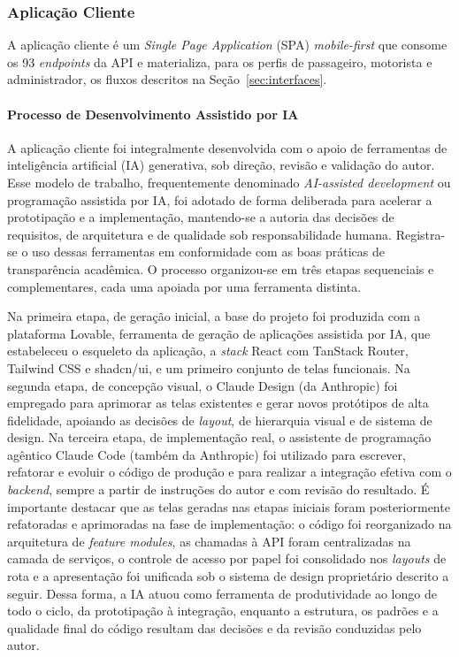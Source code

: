 \subsubsection{Aplicação Cliente}
\label{sec:cliente}

A aplicação cliente é um \textit{Single Page Application} (SPA) \textit{mobile-first} que consome os 93 \textit{endpoints} da API e materializa, para os perfis de passageiro, motorista e administrador, os fluxos descritos na Seção~\ref{sec:interfaces}.

\paragraph{Processo de Desenvolvimento Assistido por IA}

A aplicação cliente foi integralmente desenvolvida com o apoio de ferramentas de inteligência artificial (IA) generativa, sob direção, revisão e validação do autor. Esse modelo de trabalho, frequentemente denominado \textit{AI-assisted development} ou programação assistida por IA, foi adotado de forma deliberada para acelerar a prototipação e a implementação, mantendo-se a autoria das decisões de requisitos, de arquitetura e de qualidade sob responsabilidade humana. Registra-se o uso dessas ferramentas em conformidade com as boas práticas de transparência acadêmica. O processo organizou-se em três etapas sequenciais e complementares, cada uma apoiada por uma ferramenta distinta.

Na primeira etapa, de geração inicial, a base do projeto foi produzida com a plataforma Lovable, ferramenta de geração de aplicações assistida por IA, que estabeleceu o esqueleto da aplicação, a \textit{stack} React com TanStack Router, Tailwind CSS e shadcn/ui, e um primeiro conjunto de telas funcionais. Na segunda etapa, de concepção visual, o Claude Design (da Anthropic) foi empregado para aprimorar as telas existentes e gerar novos protótipos de alta fidelidade, apoiando as decisões de \textit{layout}, de hierarquia visual e de sistema de design. Na terceira etapa, de implementação real, o assistente de programação agêntico Claude Code (também da Anthropic) foi utilizado para escrever, refatorar e evoluir o código de produção e para realizar a integração efetiva com o \textit{backend}, sempre a partir de instruções do autor e com revisão do resultado. É importante destacar que as telas geradas nas etapas iniciais foram posteriormente refatoradas e aprimoradas na fase de implementação: o código foi reorganizado na arquitetura de \textit{feature modules}, as chamadas à API foram centralizadas na camada de serviços, o controle de acesso por papel foi consolidado nos \textit{layouts} de rota e a apresentação foi unificada sob o sistema de design proprietário descrito a seguir. Dessa forma, a IA atuou como ferramenta de produtividade ao longo de todo o ciclo, da prototipação à integração, enquanto a estrutura, os padrões e a qualidade final do código resultam das decisões e da revisão conduzidas pelo autor.

